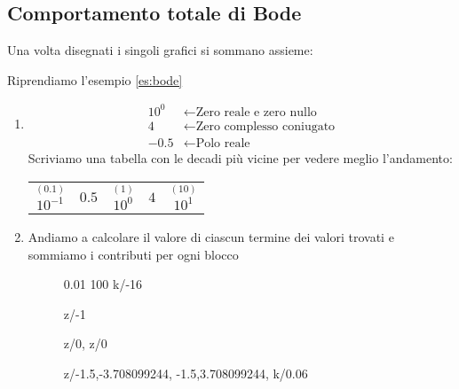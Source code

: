 \documentclass[a4paper]{article}
\begin{document}
\subsection{Comportamento totale di Bode}
Una volta disegnati i singoli grafici si sommano assieme:
\begin{example}
  Riprendiamo l'esempio \ref{es:bode}
  \begin{enumerate}
    \item 
      \[
        \begin{aligned}
          10^0 & \leftarrow \text{Zero reale e zero nullo}\\
          4 & \leftarrow \text{Zero complesso coniugato}\\
          -0.5 & \leftarrow \text{Polo reale}
        \end{aligned}
      \] 
      Scriviamo una tabella con le decadi più vicine per vedere meglio l'andamento:
      \begin{table}[H]
        \centering
        \begin{tabular}{c|c|c|c|c}
          $\stackrel{(0.1)}{10^{-1}}$ & $0.5$ & $\stackrel{(1)}{10^{0}}$ & $4$ & $\stackrel{(10)}{10^{1}}$\\
        \end{tabular}
      \end{table}

    \item Andiamo a calcolare il valore di ciascun termine dei valori trovati e sommiamo i contributi per ogni blocco
    \begin{figure}[H]
      \centering
      \begin{BodeMagPlot}[scale=1.9,ytick distance=20,ylabel={Ampiezza (dB)},xlabel={Frequenza (rad/s)}] {0.01} {100}
        {
          k/-16
        }

        {
          z/-1
        }

        {
          z/0,
          z/0
        }

        {
          z/{{-1.5,-3.708099244}, {-1.5,3.708099244}},
          k/0.06
        }


\end{BodeMagPlot}
\end{figure}
\end{enumerate}
\end{example}
\end{document}
